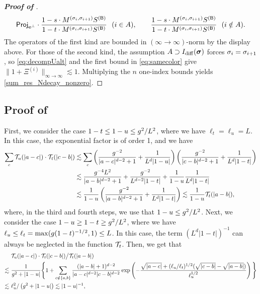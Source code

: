 \begin{proof}[\bf Proof of ]
\[{\mathsf{Proj}}_{\mathbf e^{\perp}}\cdot  \frac{1 - s \cdot M^{(\sigma_i,\sigma_{i+1})}S^{({\mathsf{B}})}}{1 - t \cdot M^{(\sigma_i,\sigma_{i+1})}S^{({\mathsf{B}})}}\ \ (i\in A),\qquad  \frac{1 - s \cdot M^{(\sigma_i,\sigma_{i+1})}S^{({\mathsf{B}})}}{1 - t \cdot M^{(\sigma_i,\sigma_{i+1})}S^{({\mathsf{B}})}}\ \ (i\notin A).\]
The operators of the first kind are bounded in $(\infty\to\infty)$-norm by the display above. For those of the second kind, the assumption $A\supset I_{\mathrm{diff}}({\boldsymbol{\sigma}})$ forces $\sigma_i=\sigma_{i+1}$, so \eqref{eq:decompUalt} and the first bound in \eqref{eq:samecolor} give $\|1+\Xi^{(i)}\|_{\infty\to\infty}\lesssim 1$. Multiplying the $n$ one-index bounds yields \eqref{sum_res_Ndecay_nonzero}. 
\end{proof}

\subsection{Proof of }\label{sec:pfpropT}
First, we consider the case $1-t \le  1-u \le g^2/L^{2}$, where we have $\ell_t=\ell_u=L$. In this case, the exponential factor is of order 1, and we have 
\begin{align}
	\sum_{c}{\mathcal T}_{u}(|a-c|)\cdot {\mathcal T}_{t}(|c-b|) &\lesssim \sum_{c} \left(\frac{g^{-2}}{|a-c|^{d-2}+1}+\frac{1}{L^d|1-u|}\right)\left(\frac{g^{-2}}{|c-b|^{d-2}+1}+\frac{1}{L^{d}|1-t|}\right) \nonumber
	\\\nonumber
	&\lesssim  \frac{g^{-4}L^2}{|a-b|^{d-2}+1} + \frac{g^{-2}}{L^{d-2}|1-t|}+\frac{1}{1-u}\frac{1}{L^d |1-t|} 
	\\
	 &\lesssim   \frac{1}{1-u}\left(
	\frac{g^{-2}}{|a-b|^{d-2}+1}+\frac{1}{L^d |1-t|}\right)
	\lesssim   \frac{1}{1-u} {\mathcal T}_{t}(|a-b|),\label{eq:smalletacase}
\end{align}   
where, in the third and fourth steps, we use that $1-u\le g^2/L^2$. Next, we consider the case $1-u\ge 1-t \ge g^2/L^{2}$, where we have $\ell_u \le \ell_t=\max(g(1-t)^{-1/2},1)\le L$. In this case, the term $(L^d|1-t|)^{-1}$ can always be neglected in the function $\mathcal T_t$. Then, we get that
\begin{align}
&~	 {{\mathcal T}_{u}(|a-c|)\cdot {\mathcal T}_{t}(|c-b|)}\big/{{\mathcal T}_{t}(|a-b|)} \nonumber\\
\lesssim &~ \frac{1}{g^2+|1-u|}\Bigg\{1 + \sum_{c\notin \{a,b\}}  \frac{(|a-b|+1)^{d-2}}{|a-c|^{d-2}|c-b|^{d-2}  }\exp \left(-\frac{\sqrt{|a-c|}+
	(\ell_u/\ell_t)^{1/2}(\sqrt{|c-b|}-\sqrt{|a-b|})}{\ell_u^{1/2}} \right)\Bigg\} \nonumber\\
\lesssim &~ {\ell_u^2}/\left({g^2+|1-u|}\right) \lesssim |1-u|^{-1},\label{eq:largeetacase}
\end{align}
